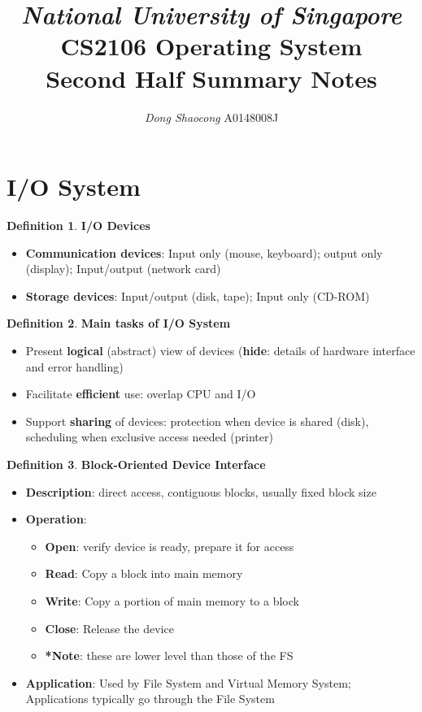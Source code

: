 \documentclass[11pt,a4paper]{article}
\title{\textsl{National University of Singapore} \\ \textbf{CS2106 Operating System}\\ Second Half Summary Notes}
\author{\textit{Dong Shaocong} A0148008J}
\theoremstyle{definition}
\newtheorem{definition}{Definition}[section]
\newenvironment{myitemize}
{ \begin{itemize}
    \setlength{\itemsep}{5pt}
    \setlength{\parskip}{0pt}
    \setlength{\parsep}{0pt}     }
{ \end{itemize}                  }
\begin{document}
\maketitle
\section{I/O System}

\begin{definition}{\textbf{I/O Devices}}
	\begin{myitemize}
		\item \textbf{Communication devices}: Input only (mouse, keyboard); output only (display); Input/output (network card)
		\item \textbf{Storage devices}: Input/output (disk, tape); Input only (CD-ROM)
	\end{myitemize}
\end{definition}

\begin{definition}{\textbf{Main tasks of I/O System}}
	\begin{myitemize}
		\item Present \textbf{logical} (abstract) view of devices (\textbf{hide}: details of hardware interface and error handling)
		\item Facilitate \textbf{efficient} use: overlap CPU and I/O
		\item Support \textbf{sharing} of devices: protection when device is shared (disk), scheduling when exclusive access needed (printer)
	\end{myitemize}
\end{definition}

\begin{definition}{\textbf{Block-Oriented Device Interface}}
	\begin{myitemize}
		\item \textbf{Description}: direct access, contiguous blocks, usually fixed block size
		\item \textbf{Operation}:
		\begin{myitemize}
			\item \textbf{Open}: verify device is ready, prepare it for access
			\item \textbf{Read}: Copy a block into main memory 
			\item \textbf{Write}: Copy a portion of main memory to a block
			\item \textbf{Close}: Release the device
			\item \textbf{*Note}: these are lower level than those of the FS 
		\end{myitemize}
		\item \textbf{Application}: Used by File System and Virtual Memory System; Applications typically go through the File System
	\end{myitemize}
\end{definition}
\end{document}
